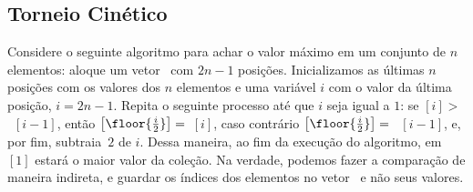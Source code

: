 
\subsection{Torneio Cinético} \label{torneio:secao}
Considere o seguinte algoritmo para achar o valor máximo
em um conjunto de $n$ elementos: aloque um vetor \torneio~com
$2n - 1$ posições. Inicializamos as últimas $n$ posições com
os valores dos $n$ elementos e uma variável $i$ com o valor
da última posição, $i = 2n - 1$. Repita o seguinte processo
até que $i$ seja igual a $1$: se \torneio$[i] > $~\torneio$[i - 1]$,
então \torneio$\left[\floor{\frac{i}{2}}\right] =$~\torneio$[i]$,
caso contrário \torneio$\left[\floor{\frac{i}{2}}\right] =$~
\torneio$[i - 1]$, e, por fim, subtraia~$2$ de $i$. Dessa maneira,
ao fim da execução do algoritmo, em \torneio$[1]$ estará o maior
valor da coleção. Na verdade, podemos fazer a comparação de
maneira indireta, e guardar os índices dos elementos no vetor
\torneio~e não seus valores.

